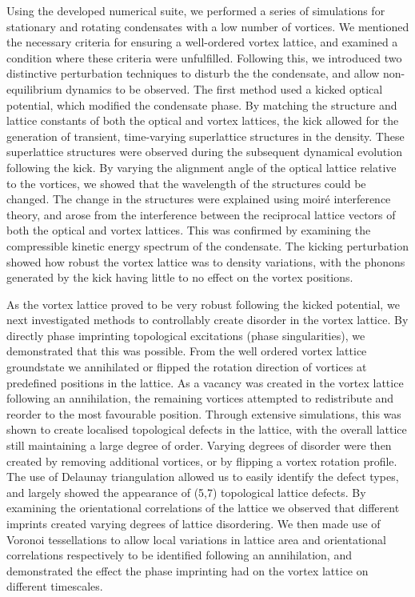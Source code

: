 Using the developed numerical suite, we performed a series of simulations for stationary and rotating condensates with a low number of vortices. We mentioned the necessary criteria for ensuring a well-ordered vortex lattice, and examined a condition where these criteria were unfulfilled. Following this, we introduced two distinctive perturbation techniques to disturb the the condensate, and allow non-equilibrium dynamics to be observed. The first method used a kicked optical potential, which modified the condensate phase. By matching the structure and lattice constants of both the optical and vortex lattices, the kick allowed for the generation of transient, time-varying superlattice structures in the density. These superlattice structures were observed during the subsequent dynamical evolution following the kick. By varying the alignment angle of the optical lattice relative to the vortices, we showed that the wavelength of the structures could be changed. The change in the structures were explained using moir\'e interference theory, and arose from the interference between the reciprocal lattice vectors of both the optical and vortex lattices. This was confirmed by examining the compressible kinetic energy spectrum of the condensate. The kicking perturbation showed how robust the vortex lattice was to density variations, with the phonons generated by the kick having little to no effect on the vortex positions.

As the vortex lattice proved to be very robust following the kicked potential, we next investigated methods to controllably create disorder in the vortex lattice. By directly phase imprinting topological excitations (phase singularities), we demonstrated that this was possible. From the well ordered vortex lattice groundstate we annihilated or flipped the rotation direction of vortices at predefined positions in the lattice. As a vacancy was created in the vortex lattice following an annihilation, the remaining vortices attempted to redistribute and reorder to the most favourable position. Through extensive simulations, this was shown to create localised topological defects in the lattice, with the overall lattice still maintaining a large degree of order. Varying degrees of disorder were then created by removing additional vortices, or by flipping a vortex rotation profile. The use of Delaunay triangulation allowed us to easily identify the defect types, and largely showed the appearance of (5,7) topological lattice defects. By examining the orientational correlations of the lattice we observed that different imprints created varying degrees of lattice disordering. We then made use of Voronoi tessellations to allow local variations in lattice area and orientational correlations respectively to be identified following an annihilation, and demonstrated the effect the phase imprinting had on the vortex lattice on different timescales.

